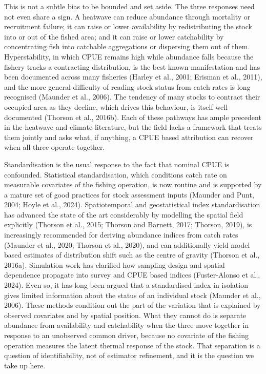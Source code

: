 \documentclass[
  11pt,
  a4paper,
]{article}
\begin{document}
This is not a subtle bias to be bounded and set aside. The three
responses need not even share a sign. A heatwave can reduce abundance
through mortality or recruitment failure; it can raise or lower
availability by redistributing the stock into or out of the fished area;
and it can raise or lower catchability by concentrating fish into
catchable aggregations or dispersing them out of them. Hyperstability,
in which CPUE remains high while abundance falls because the fishery
tracks a contracting distribution, is the best known manifestation and
has been documented across many fisheries (Harley et al., 2001; Erisman
et al., 2011), and the more general difficulty of reading stock status
from catch rates is long recognised (Maunder et al., 2006). The tendency
of many stocks to contract their occupied area as they decline, which
drives this behaviour, is itself well documented (Thorson et al.,
2016b). Each of these pathways has ample precedent in the heatwave and
climate literature, but the field lacks a framework that treats them
jointly and asks what, if anything, a CPUE based attribution can recover
when all three operate together.

Standardisation is the usual response to the fact that nominal CPUE is
confounded. Statistical standardisation, which conditions catch rate on
measurable covariates of the fishing operation, is now routine and is
supported by a mature set of good practices for stock assessment inputs
(Maunder and Punt, 2004; Hoyle et al., 2024). Spatiotemporal and
geostatistical index standardisation has advanced the state of the art
considerably by modelling the spatial field explicitly (Thorson et al.,
2015; Thorson and Barnett, 2017; Thorson, 2019), is increasingly
recommended for deriving abundance indices from catch rates (Maunder et
al., 2020; Thorson et al., 2020), and can additionally yield model based
estimates of distribution shift such as the centre of gravity (Thorson
et al., 2016a). Simulation work has clarified how sampling design and
spatial dependence propagate into survey and CPUE based indices
(Fuster-Alonso et al., 2024). Even so, it has long been argued that a
standardised index in isolation gives limited information about the
status of an individual stock (Maunder et al., 2006). These methods
condition out the part of the variation that is explained by observed
covariates and by spatial position. What they cannot do is separate
abundance from availability and catchability when the three move
together in response to an unobserved common driver, because no
covariate of the fishing operation measures the latent thermal response
of the stock. That separation is a question of identifiability, not of
estimator refinement, and it is the question we take up here.
\end{document}
